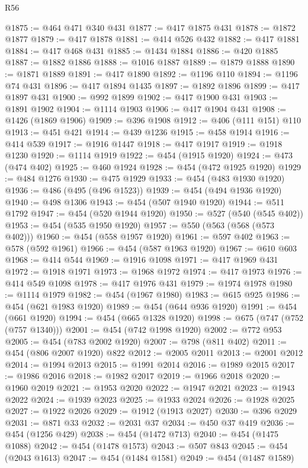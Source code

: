 \begin{lexlean}{R56}
\begin{coremodule}
@1875 := @464 @471 @340 @431
@1877 := @417 @1875 @431
@1878 := @1872 @1877
@1879 := @417 @1878
@1881 := @414 @526 @432
@1882 := @417 @1881
@1884 := @417 @468 @431
@1885 := @1434 @1884
@1886 := @420 @1885
@1887 := @1882 @1886
@1888 := @1016 @1887
@1889 := @1879 @1888
@1890 := @1871 @1889
@1891 := @417 @1890
@1892 := @1196 @110
@1894 := @1196 @74 @431
@1896 := @417 @1894 @1435
@1897 := @1892 @1896
@1899 := @417 @1897 @431
@1900 := @992 @1899
@1902 := @417 @1900 @431
@1903 := @1891 @1902
@1904 := @1114 @1903
@1906 := @417 @1904 @431
@1908 := @1426 (@1869 @1906)
@1909 := @396 @1908
@1912 := @406 (@111 @151) @110
@1913 := @451 @421
@1914 := @439 @1236
@1915 := @458 @1914
@1916 := @414 @539
@1917 := @1916 @1447
@1918 := @417 @1917
@1919 := @1918 @1230
@1920 := @1114 @1919
@1922 := @454 (@1915 @1920)
@1924 := @473 (@474 @402)
@1925 := @460 @1924
@1928 := @454 (@472 @1925 @1920)
@1929 := @484 @1276
@1930 := @475 @1929
@1933 := @454 (@483 @1930 @1920)
@1936 := @486 (@495 (@496 @1523))
@1939 := @454 (@494 @1936 @1920)
@1940 := @498 @1306
@1943 := @454 (@507 @1940 @1920)
@1944 := @511 @1792
@1947 := @454 (@520 @1944 @1920)
@1950 := @527 (@540 (@545 @402))
@1953 := @454 (@535 @1950 @1920)
@1957 := @550 (@563 (@568 (@573 @402)))
@1960 := @454 (@558 @1957 @1920)
@1961 := @597 @402
@1963 := @578 (@592 @1961)
@1966 := @454 (@587 @1963 @1920)
@1967 := @610 @603
@1968 := @414 @544
@1969 := @1916 @1098
@1971 := @417 @1969 @431
@1972 := @1918 @1971
@1973 := @1968 @1972
@1974 := @417 @1973
@1976 := @414 @549 @1098
@1978 := @417 @1976 @431
@1979 := @1974 @1978
@1980 := @1114 @1979
@1982 := @454 (@1967 @1980)
@1983 := @615 @925
@1986 := @454 (@621 @1983 @1920)
@1989 := @454 (@644 @936 @1920)
@1991 := @454 (@661 @1920)
@1994 := @454 (@665 @1328 @1920)
@1998 := @675 (@747 (@752 (@757 @1340)))
@2001 := @454 (@742 @1998 @1920)
@2002 := @772 @953
@2005 := @454 (@783 @2002 @1920)
@2007 := @798 (@811 @402)
@2011 := @454 (@806 @2007 @1920) @822
@2012 := @2005 @2011
@2013 := @2001 @2012
@2014 := @1994 @2013
@2015 := @1991 @2014
@2016 := @1989 @2015
@2017 := @1986 @2016
@2018 := @1982 @2017
@2019 := @1966 @2018
@2020 := @1960 @2019
@2021 := @1953 @2020
@2022 := @1947 @2021
@2023 := @1943 @2022
@2024 := @1939 @2023
@2025 := @1933 @2024
@2026 := @1928 @2025
@2027 := @1922 @2026
@2029 := @1912 (@1913 @2027)
@2030 := @396 @2029
@2031 := @871 @33
@2032 := @2031 @37
@2034 := @450 @37 @419
@2036 := @454 (@1256 @429)
@2038 := @454 (@1472 @713)
@2040 := @454 (@1475 @1088)
@2042 := @454 (@1478 @1573)
@2043 := @507 @843
@2045 := @454 (@2043 @1613)
@2047 := @454 (@1484 @1581)
@2049 := @454 (@1487 @1589)

\end{coremodule}
\end{lexlean}
